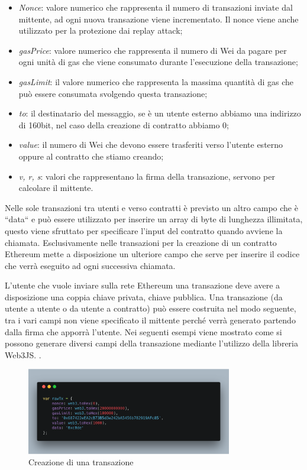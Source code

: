 \documentclass[12pt]{report}
\begin{document}
\begin{itemize}
\item \textit{Nonce}: valore numerico che rappresenta il numero di transazioni inviate dal mittente, ad ogni nuova transazione viene incrementato. Il nonce viene anche utilizzato per la protezione dai replay attack;
\item \textit{gasPrice}: valore numerico che rappresenta il numero di Wei da pagare per ogni unità di gas che viene consumato durante l'esecuzione della transazione;
\item \textit{gasLimit}: il valore numerico che rappresenta la massima quantità di gas che può essere consumata svolgendo questa transazione;
\item \textit{to}: il destinatario del messaggio, se è un utente esterno abbiamo una indirizzo di 160bit, nel caso della creazione di contratto abbiamo 0;
\item \textit{value}: il numero di Wei che devono essere trasferiti verso l'utente esterno oppure al contratto che stiamo creando;
\item \textit{v, r, s}: valori che rappresentano la firma della transazione, servono per calcolare il mittente.
\end{itemize}

Nelle sole transazioni tra utenti e verso contratti è previsto un altro campo che è ``data`` e può essere utilizzato per inserire un array di byte di lunghezza illimitata, questo viene sfruttato per specificare l'input del contratto quando avviene la chiamata.
Esclusivamente nelle transazioni per la creazione di un contratto Ethereum mette a disposizione un ulteriore campo che serve per inserire il codice che verrà eseguito ad ogni successiva chiamata.

L'utente che vuole inviare sulla rete Ethereum una transazione deve avere a disposizione una coppia chiave privata, chiave pubblica.
Una transazione (da utente a utente o da utente a contratto) può essere costruita nel modo seguente, tra i vari campi non viene specificato il mittente perché verrà generato partendo dalla firma che apporrà l'utente. Nei seguenti esempi viene mostrato come si possono generare diversi campi della transazione mediante l'utilizzo della libreria Web3JS. \cite{Web3JS}.

\begin{figure}[H]
    \centering\includegraphics[width=0.8\textwidth]{carbon-8}
    \caption{Creazione di una transazione}
\end{figure}
\end{document}
